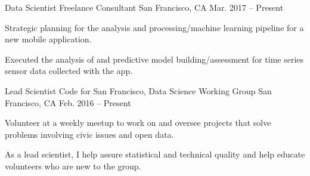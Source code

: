 
\begin{cventries}

  \cventry
    {Data Scientist} %
    {Freelance Consultant} %
    {San Francisco, CA} %
    {Mar. 2017 -- Present} %
    {
      \begin{cvitems} %
        \item {Strategic planning for the analysis and processing/machine learning pipeline for a new mobile application.}
        \item {Executed the analysis of and predictive model building/assessment for time series sensor data collected with the app.}
     \end{cvitems}
    }

  \cventry
    {Lead Scientist} %
    {Code for San Francisco, Data Science Working Group} %
    {San Francisco, CA} %
    {Feb. 2016 -- Present} %
    {
      \begin{cvitems} %
        \item {Volunteer at a weekly meetup to work on and oversee projects that solve problems involving civic issues and open data.}
        \item {As a lead scientist, I help assure statistical and technical quality and help educate volunteers who are new to the group.}
      \end{cvitems}
    }


\end{cventries}
